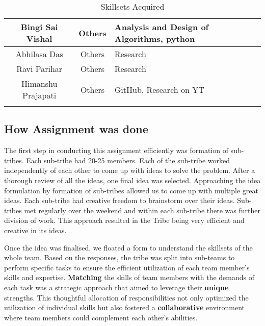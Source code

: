 \begin{center}
\begin{longtable}{ | c | c | m{6cm} | }
        \hline
        Bingi Sai Vishal           & Others            & Analysis and Design of Algorithms, python                               \\
        \hline
        Abhilasa Das               & Others            & Research                                                                \\
        \hline
        Ravi Parihar               & Others            & Research                                                                \\
        \hline
        Himanshu Prajapati         & Others            & GitHub, Research on YT                                                  \\
        \hline


        \hline
        \caption{Skillsets Acquired}
    \end{longtable}
\end{center}

\subsection{How Assignment was done}


The first step in conducting this assignment efficiently was formation of sub-tribes. Each sub-tribe had 20-25 members. Each of the sub-tribe worked independently of each other to come up with ideas to solve the problem. After a thorough review of all the ideas, one final idea was selected. Approaching the idea formulation by formation of sub-tribes allowed us to come up with multiple great ideas. Each sub-tribe had creative freedom to brainstorm over their ideas. Sub-tribes met regularly over the weekend and within each sub-tribe there was further division of work. This approach resulted in the Tribe being very efficient and creative in its ideas.

Once the idea was finalised, we floated a form to understand the skillsets of the whole team. Based on the responses, the tribe was split into sub-teams to perform specific tasks to ensure the efficient utilization of each team member's skills and expertise. \textbf{Matching} the skills of team members with the demands of each task was a strategic approach that aimed to leverage their \textbf{unique} strengths. This thoughtful allocation of responsibilities not only optimized the utilization of individual skills but also fostered a \textbf{collaborative} environment where team members could complement each other's abilities.


